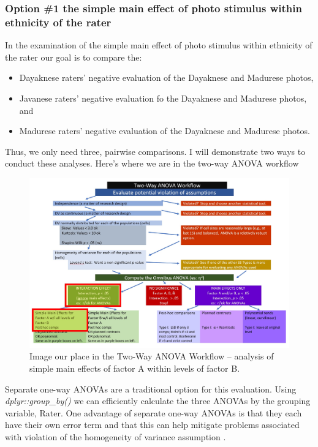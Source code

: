 \documentclass[
  11pt,
]{book}
\providecommand{\tightlist}{%
  \setlength{\itemsep}{0pt}\setlength{\parskip}{0pt}}
\begin{document}
\hypertarget{option-1-the-simple-main-effect-of-photo-stimulus-within-ethnicity-of-the-rater}{%
\subsubsection{Option \#1 the simple main effect of photo stimulus within ethnicity of the rater}\label{option-1-the-simple-main-effect-of-photo-stimulus-within-ethnicity-of-the-rater}}

In the examination of the simple main effect of photo stimulus within ethnicity of the rater our goal is to compare the:

\begin{itemize}
\tightlist
\item
  Dayaknese raters' negative evaluation of the Dayaknese and Madurese photos,
\item
  Javanese raters' negative evaluation fo the Dayaknese and Madurese photos, and
\item
  Madurese raters' negative evaluation of the Dayaknese and Madurese photos.
\end{itemize}

Thus, we only need three, pairwise comparisons. I will demonstrate two ways to conduct these analyses. Here's where we are in the two-way ANOVA workflow

\begin{figure}
\centering
\includegraphics{images/factorial/WrkFlo_IntSmp1.jpg}
\caption{Image our place in the Two-Way ANOVA Workflow -- analysis of simple main effects of factor A within levels of factor B.}
\end{figure}

Separate one-way ANOVAs are a traditional option for this evaluation. Using \emph{dplyr::group\_by()} we can efficiently calculate the three ANOVAs by the grouping variable, Rater. One advantage of separate one-way ANOVAs is that they each have their own error term and that this can help mitigate problems associated with violation of the homogeneity of variance assumption \citep{kassambara_anova_nodate}.
\end{document}
